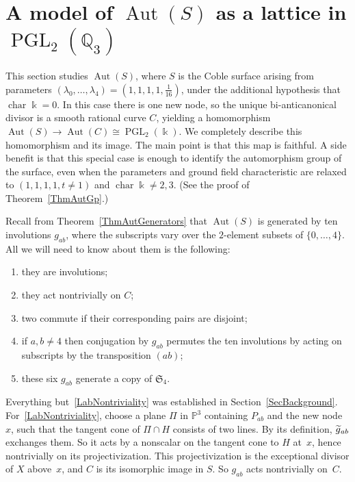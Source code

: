 \documentclass[11pt]{article}
\theoremstyle{definition}
\numberwithin{equation}{section}
\numberwithin{figure}{section}
\numberwithin{table}{section}
\let\oldtilde\tilde
\renewcommand*\tilde[1]{\mathchoice{\widetilde{#1}}{\widetilde{#1}}{\oldtilde{#1}}{\oldtilde{#1}}}
\newcommand*\gtilde{\tilde g}
\let\iso\cong
\newcommand{\bbP}{{\mathbb{P}}}
\newcommand{\bbQ}{{\mathbb{Q}}}
\DeclareMathOperator{\PGL}{PGL}
\DeclareMathOperator{\Aut}{Aut}
\DeclareMathOperator{\cha}{char}
\newcommand{\frakS}{\mathfrak{S}}
\begin{document}
\section{A model of \texorpdfstring{$\Aut(S)$}{Aut(S)} as a lattice in \texorpdfstring{$\PGL_2(\bbQ_3)$}{PGL2(Q3)}}\label{SecLattice}

This section studies $\Aut(S)$, where $S$ is the Coble surface arising from parameters $(\lambda_0,\dots,\lambda_4)=(1,1,1,1,\frac1{16})$, under the additional hypothesis that $\cha\Bbbk=0$. In this case there is one new node, so the unique bi-anticanonical divisor is a smooth rational curve $C$, yielding a homomorphism $\Aut(S)\to\Aut(C)\iso\PGL_2(\Bbbk)$. We completely describe this homomorphism and its image. The main point is that this map is faithful. A side benefit is that this special case is enough to identify the automorphism group of the surface, even when the parameters and ground field characteristic are relaxed to $(1,1,1,1,t\neq1)$ and $\cha\Bbbk\neq2,3$. (See the proof of Theorem~\ref{ThmAutGp}.)

Recall from Theorem~\ref{ThmAutGenerators} that $\Aut(S)$ is generated by ten involutions $g_{ab}$, where the subscripts vary over the $2$-element subsets of $\{0,\dots,4\}$. All we will need to know about them is the following:
\begin{enumerate}
\item \label{list5.1}they are involutions;
\item \label{LabNontriviality}
they act nontrivially on $C$;
\item \label{list5.3}two commute if their corresponding pairs are disjoint;
\item \label{list5.4}if $a,b\neq4$ then conjugation by $g_{ab}$ permutes the ten involutions by acting on subscripts by the transposition $(ab)$;
\item \label{list5.5}these six $g_{ab}$ generate a copy of $\frakS_4$.
\end{enumerate}
Everything but~\eqref{LabNontriviality} was established in Section~\ref{SecBackground}. For~\eqref{LabNontriviality}, choose a plane $\Pi$ in $\bbP^3$ containing $P_{ab}$ and the new node $x$, such that the tangent cone of $\Pi\cap H$ consists of two lines. By its definition, $\gtilde_{ab}$ exchanges them. So it acts by a nonscalar on the tangent cone to $H$ at~$x$, hence nontrivially on its projectivization. This projectivization is the exceptional divisor of $X$ above~$x$, and $C$ is its isomorphic image in $S$. So $g_{ab}$ acts nontrivially on~$C$.
\end{document}
